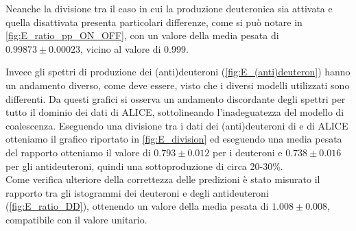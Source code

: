 Neanche la divisione tra il caso in cui la produzione deuteronica sia attivata e quella disattivata presenta particolari differenze, come si può notare in \autoref{fig:E_ratio_pp_ON_OFF}, con un valore della media pesata di $0.99873 \pm 0.00023$, vicino al valore di 0.999.

Invece gli spettri di produzione dei (anti)deuteroni (\autoref{fig:E_(anti)deuteron}) hanno un andamento diverso, come deve essere, visto che i diversi modelli utilizzati sono differenti.
Da questi grafici si osserva un andamento discordante degli spettri per tutto il dominio dei dati di ALICE, sottolineando l'inadeguatezza del modello di coalescenza. 
Eseguendo una divisione tra i dati dei (anti)deuteroni di \pythia{} e di ALICE otteniamo il grafico riportato in \autoref{fig:E_division} ed eseguendo una media pesata del rapporto otteniamo il valore di $0.793 \pm 0.012$ per i deuteroni e $0.738 \pm 0.016$ per gli antideuteroni, quindi una sottoproduzione di circa 20-30\%.\\

Come verifica ulteriore della correttezza delle predizioni è stato misurato il rapporto tra gli istogrammi dei deuteroni e degli antideuteroni (\autoref{fig:E_ratio_DD}), ottenendo un valore della media pesata di $1.008 \pm 0.008$, compatibile con il valore unitario.\\

